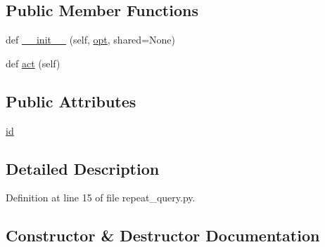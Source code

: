 \subsection*{Public Member Functions}
\begin{DoxyCompactItemize}
\item 
def \hyperlink{classparlai_1_1agents_1_1repeat__query_1_1repeat__query_1_1RepeatQueryAgent_a1ebfe807ecdf068282d681b5047b035a}{\+\_\+\+\_\+init\+\_\+\+\_\+} (self, \hyperlink{classparlai_1_1core_1_1agents_1_1Agent_ab3b45d2754244608c75d4068b90cd051}{opt}, shared=None)
\item 
def \hyperlink{classparlai_1_1agents_1_1repeat__query_1_1repeat__query_1_1RepeatQueryAgent_a7db5db4eda3e033a9022a4f4fe74419b}{act} (self)
\end{DoxyCompactItemize}
\subsection*{Public Attributes}
\begin{DoxyCompactItemize}
\item 
\hyperlink{classparlai_1_1agents_1_1repeat__query_1_1repeat__query_1_1RepeatQueryAgent_ab6fbd1dbd2b197d0ab72d3f9f11c9d8a}{id}
\end{DoxyCompactItemize}


\subsection{Detailed Description}


Definition at line 15 of file repeat\+\_\+query.\+py.



\subsection{Constructor \& Destructor Documentation}
\mbox{\label{classparlai_1_1agents_1_1repeat__query_1_1repeat__query_1_1RepeatQueryAgent_a1ebfe807ecdf068282d681b5047b035a}} 
